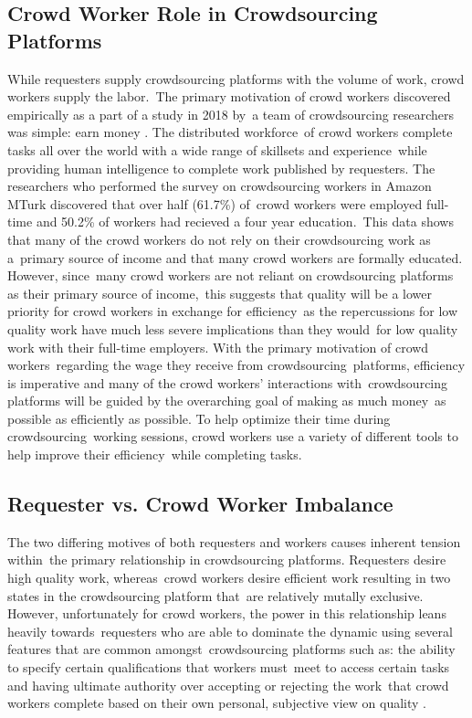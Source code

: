 \documentclass[letterpaper,12pt]{article}
\begin{document}
\subsection{Crowd Worker Role in Crowdsourcing Platforms}
While requesters supply crowdsourcing platforms with the volume of work, crowd workers supply the labor.\
The primary motivation of crowd workers discovered empirically as a part of a study in 2018 by\
a team of crowdsourcing researchers was simple: earn money \cite{Kaplan2018}. The distributed workforce\
of crowd workers complete tasks all over the world with a wide range of skillsets and experience\
while providing human intelligence to complete work published by requesters. The researchers
who performed the survey on crowdsourcing workers in Amazon MTurk discovered that over half (61.7\%) of\
crowd workers were employed full-time and 50.2\% of workers had recieved a four year education.\cite{Kaplan2018}\
This data shows that many of the crowd workers do not rely on their crowdsourcing work as a\
primary source of income and that many crowd workers are formally educated. However, since\
many crowd workers are not reliant on crowdsourcing platforms as their primary source of income,\
this suggests that quality will be a lower priority for crowd workers in exchange for efficiency\
as the repercussions for low quality work have much less severe implications than they would\
for low quality work with their full-time employers. With the primary motivation of crowd workers\
regarding the wage they receive from crowdsourcing\
platforms, efficiency is imperative and many of the crowd workers' interactions with\
crowdsourcing platforms will be guided by the overarching goal of making as much money\
as possible as efficiently as possible. To help optimize their time during crowdsourcing\
working sessions, crowd workers use a variety of different tools to help improve their efficiency\
while completing tasks.

\subsection{Requester vs. Crowd Worker Imbalance}
The two differing motives of both requesters and workers causes inherent tension within\
the primary relationship in crowdsourcing platforms. Requesters desire high quality work, whereas\
crowd workers desire efficient work resulting in two states in the crowdsourcing platform that\
are relatively mutally exclusive. However, unfortunately for crowd workers, the power in this relationship leans heavily towards\
requesters who are able to dominate the dynamic using several features that are common amongst\
crowdsourcing platforms such as: the ability to specify certain qualifications that workers must\
meet to access certain tasks and having ultimate authority over accepting or rejecting the work\
that crowd workers complete based on their own personal, subjective view on quality \cite{Kaplan2018,allahbakhsh2013quality}.\
\end{document}
